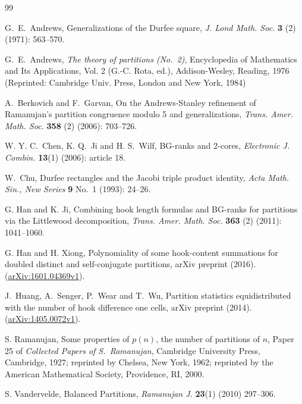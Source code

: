 \documentclass[12pt,reqno]{amsart}
\numberwithin{equation}{section}
\theoremstyle{plain}
\theoremstyle{definition}
\begin{document}
\begin{thebibliography}{99}

 G.~E.~Andrews, Generalizations of the Durfee square, \textit{J. Lond Math. Soc.} \textbf{3} (2) (1971): 563--570.

 G.~E.~Andrews, \emph{The theory of partitions (No.~2)}, Encyclopedia of Mathematics and Its Applications, Vol. 2 (G.-C. Rota, ed.), Addison-Wesley, Reading, 1976 (Reprinted: Cambridge Univ. Press, London and New York, 1984)

 A.~Berkovich and F.~Garvan, On the Andrews-Stanley refinement of Ramanujan's partition congruence modulo 5 and generalizations, \textit{Trans. Amer. Math. Soc.} {\bf 358} (2) (2006): 703--726.

 W. Y. C.~Chen, K. Q.~Ji and H. S.~Wilf, BG-ranks and 2-cores, \textit{Electronic J. Combin.} {\bf 13}(1) (2006): article 18.

 W.~Chu, Durfee rectangles and the Jacobi triple product identity, \textit{Acta Math. Sin., New Series} {\bf 9} No.~1 (1993): 24--26.

 G. Han and K. Ji, Combining hook length formulas and BG-ranks for partitions via the Littlewood decomposition, \textit{Trans. Amer. Math. Soc.} {\bf 363} (2) (2011): 1041--1060.

 G. Han and H. Xiong, Polynomiality of some hook-content summations for doubled distinct and self-conjugate partitions, arXiv preprint (2016). (\href{http://arxiv.org/abs/1601.04369v1}{arXiv:1601.04369v1}).

 J.~Huang, A.~Senger, P.~Wear and T.~Wu, Partition statistics equidistributed with the number of hook difference one cells, arXiv preprint (2014). (\href{http://arxiv.org/abs/1405.0072v1}{arXiv:1405.0072v1}).

S. Ramanujan, Some properties of $p(n)$, the number of partitions of $n$, Paper 25 of \textit{Collected Papers of S.~Ramanujan}, Cambridge University Press, Cambridge, 1927; reprinted by Chelsea, New York, 1962; reprinted by the American Mathematical Society, Providence, RI, 2000.

 S. Vandervelde, Balanced Partitions, \textit{Ramanujan J.} \textbf{23}(1) (2010) 297--306.

\end{thebibliography}
\end{document}
